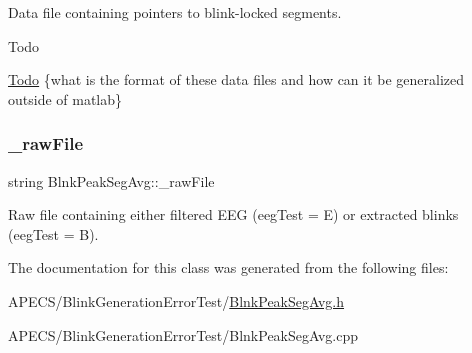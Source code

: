 Data file containing pointers to blink-\/locked segments. 

\begin{DoxyRefDesc}{Todo}
\item[\hyperlink{todo__todo000001}{Todo}]\{what is the format of these data files and how can it be generalized outside of matlab\} \end{DoxyRefDesc}
\mbox{\label{classBlnkPeakSegAvg_a1eee307d94723b3f02f01c98b9df99db}} 
\subsubsection{\texorpdfstring{\+\_\+raw\+File}{\_rawFile}}
{\footnotesize\ttfamily string Blnk\+Peak\+Seg\+Avg\+::\+\_\+raw\+File\hspace{0.3cm}{\ttfamily [private]}}

Raw file containing either filtered E\+EG (eeg\+Test = \textquotesingle{}E\textquotesingle{}) or extracted blinks (eeg\+Test = \textquotesingle{}B\textquotesingle{}). 

The documentation for this class was generated from the following files\+:\begin{DoxyCompactItemize}
\item 
A\+P\+E\+C\+S/\+Blink\+Generation\+Error\+Test/\hyperlink{BlnkPeakSegAvg_8h}{Blnk\+Peak\+Seg\+Avg.\+h}\item 
A\+P\+E\+C\+S/\+Blink\+Generation\+Error\+Test/Blnk\+Peak\+Seg\+Avg.\+cpp\end{DoxyCompactItemize}
